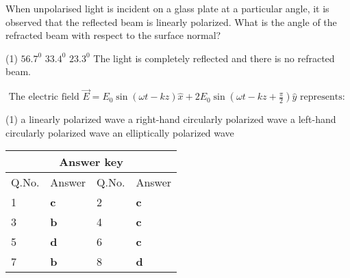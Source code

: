 \begin{enumerate}
\begin{tasks}
\end{tasks}
\begin{minipage}{\textwidth}
	\item When unpolarised light is incident on a glass plate at a particular angle, it is observed that the reflected beam is linearly polarized. What is the angle of the refracted beam with respect to the surface normal?
\end{minipage}
\begin{tasks}(1)
	\task[\textbf{A.}] $56.7^{0}$
	\task[\textbf{B.}]$33.4^{0}$
	\task[\textbf{C.}]$23.3^{0}$
	\task[\textbf{D.}]The light is completely reflected and there is no refracted beam.
\end{tasks}
\begin{minipage}{\textwidth}
	\item $\text { The electric field } \vec{E}=E_{0} \sin (\omega t-k z) \hat{x}+2 E_{0} \sin \left(\omega t-k z+\frac{\pi}{2}\right) \hat{y} \text { represents: }$
\end{minipage}
\begin{tasks}(1)
	\task[\textbf{A.}] a linearly polarized wave
	\task[\textbf{B.}]a right-hand circularly polarized wave
	\task[\textbf{C.}]a left-hand circularly polarized wave
	\task[\textbf{D.}]an elliptically polarized wave
\end{tasks}
\end{enumerate}
\setlength\arrayrulewidth{1pt}
\begin{table}[H]
	\centering
	
	\begin{tabular}{|p{1.5cm}|p{1.5cm}||p{1.5cm}|p{1.5cm}|}
		\hline
		\multicolumn{4}{|c|}{\textbf{Answer key}}\\\hline\hline
		\rowcolor{ocrel}Q.No.&Answer&Q.No.&Answer\\\hline
		1&\textbf{c}&2&\textbf{c}\\\hline
		3&\textbf{b}&4&\textbf{c}\\\hline
		5&\textbf{d}&6&\textbf{c}\\\hline
		7&\textbf{b}&8&\textbf{d}\\\hline
	\end{tabular}
\end{table}





































